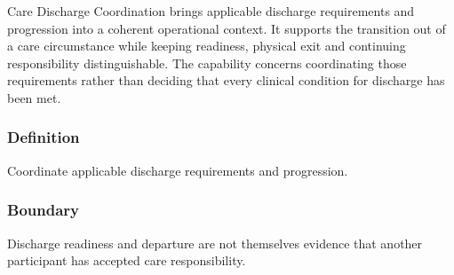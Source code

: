 Care Discharge Coordination brings applicable discharge requirements and progression into a coherent operational context. It supports the transition out of a care circumstance while keeping readiness, physical exit and continuing responsibility distinguishable. The capability concerns coordinating those requirements rather than deciding that every clinical condition for discharge has been met.

\subsubsection*{Definition}

Coordinate applicable discharge requirements and progression.

\subsubsection*{Boundary}

Discharge readiness and departure are not themselves evidence that another participant has accepted care responsibility.

